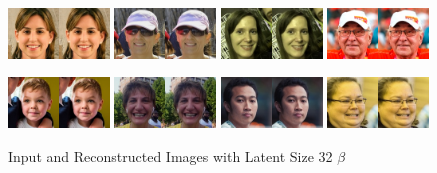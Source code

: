 \documentclass[11pt]{article}
\numberwithin{equation}{section}
\begin{document}
\begin{figure}[h]
	\caption{Input and Reconstructed Images with Latent Size 32 $\beta$}
	\label{fig:samples}
	\centering
	\includegraphics[width=0.24\textwidth]{LatentDiffusion/vae-samples/vae32/sample_0_0.png}%
	\hfill
	\includegraphics[width=0.24\textwidth]{LatentDiffusion/vae-samples/vae32/sample_0_1.png}%
	\hfill
	\includegraphics[width=0.24\textwidth]{LatentDiffusion/vae-samples/vae32/sample_0_2.png}%
	\hfill
	\includegraphics[width=0.24\textwidth]{LatentDiffusion/vae-samples/vae32/sample_0_3.png}

	\includegraphics[width=0.24\textwidth]{LatentDiffusion/vae-samples/vae32/sample_0_4.png}%
	\hfill
	\includegraphics[width=0.24\textwidth]{LatentDiffusion/vae-samples/vae32/sample_0_5.png}%
	\hfill
	\includegraphics[width=0.24\textwidth]{LatentDiffusion/vae-samples/vae32/sample_0_6.png}%
	\hfill
	\includegraphics[width=0.24\textwidth]{LatentDiffusion/vae-samples/vae32/sample_0_7.png}
\end{figure}
\end{document}
